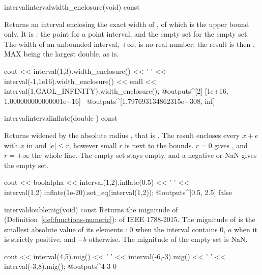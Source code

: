 \documentclass[12pt,a4paper,twoside,openright]{book}
\begin{document}
\begin{defmethod}{interval}{interval}{width\_enclosure}{(void) const}
  \begin{operation}
  \end{operation}
  Returns an interval enclosing the exact width of , of which
   is the upper bound only. It is
  : the point  for a point
  interval, and the empty set for the empty set. The width of an unbounded
  interval, $+\infty$, is no real number; the result is then
  , MAX being the largest double, as
   is.\newinvfive
\begin{example}
cout << interval(1,3).width_enclosure() << ' '
     << interval(-1,1e16).width_enclosure() << endl
     << interval(1,GAOL_INFINITY).width_enclosure();
@outputs^[2] [1e+16, 1.000000000000001e+16]~
@outputs^[1.797693134862315e+308, inf]~
\end{example}
\end{defmethod}

\begin{defmethod}{interval}{interval}{inflate}{(double ) const}
  \begin{operation}
  \end{operation}
  Returns  widened by the absolute radius , that is
  . The result encloses every
  $x+e$ with $x$ in  and $|e|\leq r$, however small $r$ is next
  to the bounds. $r=0$ gives , and $r=+\infty$ the whole line.
  The empty set stays empty, and a negative or NaN  gives the empty
  set.\newinvfive
\begin{example}
cout << boolalpha << interval(1,2).inflate(0.5) << ' '
     << interval(1,2).inflate(1e-20).set_eq(interval(1,2));
@outputs^[0.5, 2.5] false~
\end{example}
\end{defmethod}

\begin{defmethod}{interval}{double}{mig}{(void) const}
  Returns the mignitude of 
  (Definition~\ref{def:functions-numeric}):  of IEEE 1788-2015.
  The mignitude of  is the smallest absolute value of its
  elements \cite[chap.~3]{Hansen:book92}: $0$ when the interval contains
  $0$, $a$ when it is strictly positive, and $-b$ otherwise. The mignitude
  of the empty set is NaN.
\begin{example}
cout << interval(4,5).mig() << ' '
     << interval(-6,-3).mig() << ' '
     << interval(-3,8).mig();
@outputs^4 3 0~
\end{example}
\end{defmethod}
\end{document}
